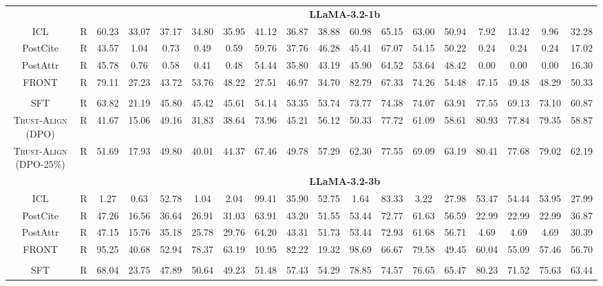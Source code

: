 \documentclass{article} %
\newcommand{\method}[0]{\textsc{Trust-Align}}
\begin{document}
\begin{table}[htb!]
{\begin{tabular}{ccc*{15}c}
& & \multicolumn{16}{c}{\cellcolor[gray]{0.9}\textbf{LLaMA-3.2-1b}} \\
ICL & R & 60.23 & 33.07 & 37.17 & 34.80 & 35.95 & 41.12 & 36.87 & 38.88 & 60.98 & 65.15 & 63.00 & 50.94 & 7.92 & 13.42 & 9.96 & 32.28 \\
PostCite & R & 43.57 & 1.04 & 0.73 & 0.49 & 0.59 & 59.76 & 37.76 & 46.28 & 45.41 & 67.07 & 54.15 & 50.22 & 0.24 & 0.24 & 0.24 & 17.02 \\
PostAttr & R & 45.78 & 0.76 & 0.58 & 0.41 & 0.48 & 54.44 & 35.80 & 43.19 & 45.90 & 64.52 & 53.64 & 48.42 & 0.00 & 0.00 & 0.00 & 16.30 \\
FRONT & R & 79.11 & 27.23 & 43.72 & 53.76 & 48.22 & 27.51 & 46.97 & 34.70 & 82.79 & 67.33 & 74.26 & 54.48 & 47.15 & 49.48 & 48.29 & 50.33 \\\\

SFT & R & 63.82 & 21.19 & 45.80 & 45.42 & 45.61 & 54.14 & 53.35 & 53.74 & 73.77 & 74.38 & 74.07 & 63.91 & 77.55 & 69.13 & 73.10 & 60.87 \\
\method{} (DPO) & R & 41.67 & 15.06 & 49.16 & 31.83 & 38.64 & 73.96 & 45.21 & 56.12 & 50.33 & 77.72 & 61.09 & 58.61 & 80.93 & 77.84 & 79.35 & 58.87 \\
\method{} (DPO-25\%) & R & 51.69 & 17.93 & 49.80 & 40.01 & 44.37 & 67.46 & 49.78 & 57.29 & 62.30 & 77.55 & 69.09 & 63.19 & 80.41 & 77.68 & 79.02 & 62.19 \\

& & \multicolumn{16}{c}{\cellcolor[gray]{0.9}\textbf{LLaMA-3.2-3b}} \\
ICL & R & 1.27 & 0.63 & 52.78 & 1.04 & 2.04 & 99.41 & 35.90 & 52.75 & 1.64 & 83.33 & 3.22 & 27.98 & 53.47 & 54.44 & 53.95 & 27.99 \\
PostCite & R  & 47.26 & 16.56 & 36.64 & 26.91 & 31.03 & 63.91 & 43.20 & 51.55 & 53.44 & 72.77 & 61.63 & 56.59 & 22.99 & 22.99 & 22.99 & 36.87 \\
PostAttr & R & 47.15 & 15.76 & 35.18 & 25.78 & 29.76 & 64.20 & 43.31 & 51.73 & 53.44 & 72.93 & 61.68 & 56.71 & 4.69 & 4.69 & 4.69 & 30.39 \\
FRONT & R & 95.25 & 40.68 & 52.94 & 78.37 & 63.19 & 10.95 & 82.22 & 19.32 & 98.69 & 66.67 & 79.58 & 49.45 & 60.04 & 55.09 & 57.46 & 56.70 \\\\

SFT & R & 68.04 & 23.75 & 47.89 & 50.64 & 49.23 & 51.48 & 57.43 & 54.29 & 78.85 & 74.57 & 76.65 & 65.47 & 80.23 & 71.52 & 75.63 & 63.44 \\


\end{tabular}}
\end{table}
\end{document}
